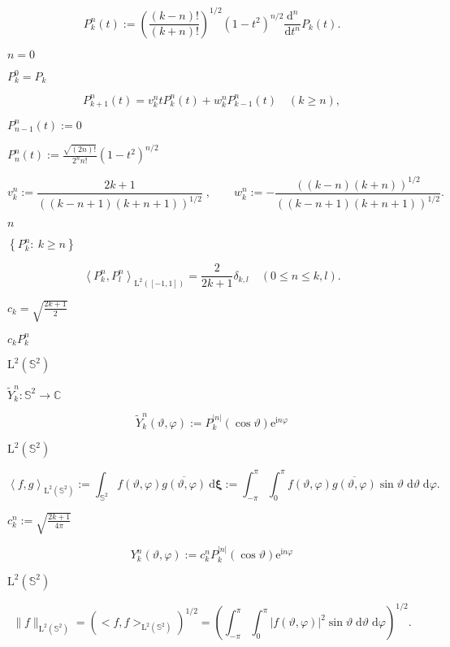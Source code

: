 \documentclass{article}
\begin{document}
\[ P_k^n(t) := \left(\frac{(k-n)!}{(k+n)!}\right)^{1/2} \left(1-t^2\right)^{n/2} \frac{\text{d}^n}{\text{d} t^n} P_k(t). \]
\pagebreak

$n = 0$
\pagebreak

$P_k^0 = P_k$
\pagebreak

\[ P_{k+1}^n(t) = v_{k}^n t P_k^n(t) + w_{k}^n P_{k-1}^n(t) \quad (k \ge n), \]
\pagebreak

$P_{n-1}^n(t) := 0$
\pagebreak

$P_{n}^n(t) := \frac{\sqrt{(2n)!}}{2^n n!} \left(1-t^2\right)^{n/2}$
\pagebreak

\[ v_{k}^n := \frac{2k+1}{((k-n+1)(k+n+1))^{1/2}}\; ,\qquad w_{k}^n := - \frac{((k-n)(k+n))^{1/2}}{((k-n+1)(k+n+1))^{1/2}}. \]
\pagebreak

$n$
\pagebreak

$\left\{P_k^n:\: k \ge n\right\}$
\pagebreak

\[ \left< P_k^n,P_l^n \right>_{\text{L}^2\left([-1,1]\right)} = \frac{2}{2k+1} \delta_{k,l} \quad (0 \le n \le k,l). \]
\pagebreak

$ c_k = \sqrt{\frac{2k+1}{2}}$
\pagebreak

$c_k P_k^n$
\pagebreak

$\text{L}^2 \left(\mathbb{S}^2\right)$
\pagebreak

$\tilde{Y}_k^n : \mathbb{S}^2 \rightarrow \mathbb{C}$
\pagebreak

\[ \tilde{Y}_k^n(\vartheta,\varphi) := P_k^{|n|}(\cos\vartheta) \mathrm{e}^{\mathrm{i} n \varphi} \]
\pagebreak

$\text{L}^2\left(\mathbb{S}^2\right)$
\pagebreak

\[ \left< f,g \right>_{\mathrm{L}^2\left(\mathbb{S}^2\right)} := \int_{\mathbb{S}^2} f(\vartheta,\varphi) \overline{g(\vartheta,\varphi)} \: \mathrm{d} \mathbf{\xi} := \int_{-\pi}^{\pi} \int_{0}^{\pi} f(\vartheta,\varphi) \overline{g(\vartheta,\varphi)} \sin \vartheta \; \mathrm{d} \vartheta \; \mathrm{d} \varphi. \]
\pagebreak

$c_k^n := \sqrt{\frac{2k+1}{4\pi}}$
\pagebreak

\[ Y_k^n(\vartheta,\varphi) := c_k^n P_k^{|n|}(\cos\vartheta) \mathrm{e}^{\mathrm{i} n \varphi} \]
\pagebreak

$\text{L}^2\left(\mathbb{S}^2 \right)$
\pagebreak

\[ \|f\|_{\text{L}^2\left(\mathbb{S}^2\right)} = \left(<f,f>_{\text{L}^2\left(\mathbb{S}^2\right)}\right)^{1/2} = \left(\int_{-\pi}^{\pi} \int_{0}^{\pi} |f(\vartheta,\varphi)|^2 \sin \vartheta \; \mathrm{d} \vartheta \; \mathrm{d} \varphi\right)^{1/2}. \]
\pagebreak
\end{document}
